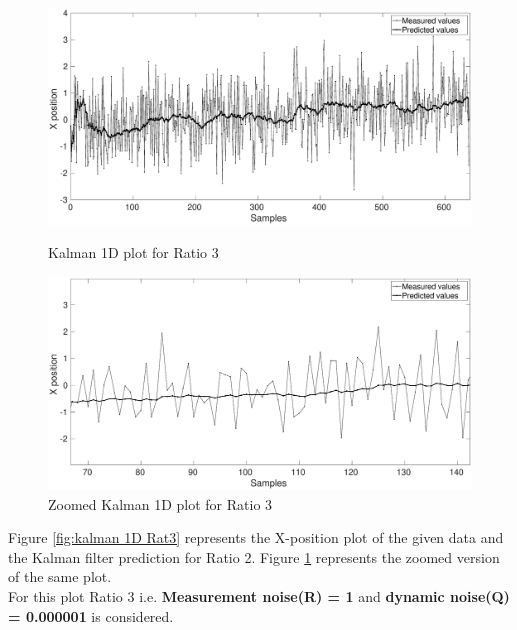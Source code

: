 \documentclass[12pt]{article}
\begin{document}
\begin{figure}[h]
\centering
\begin{minipage}{0.5\textwidth}
\centering
	\includegraphics[width = \textwidth]{./Figures/part1Ratio3.eps}
	\caption{Kalman 1D plot for Ratio 3}
	\label{fig:kalman 1D Rat3}
\end{minipage}%
\begin{minipage}{0.5\textwidth}
\centering
	\includegraphics[width = \textwidth]{./Figures/part1Ratio3zoomed.eps}
	\caption{ Zoomed Kalman 1D plot for Ratio 3}
	\label{fig: kalman 1D Rat3 zoom}
\end{minipage}
\end{figure}
\noindent
Figure \ref{fig:kalman 1D Rat3} represents the X-position plot of the given data and the Kalman filter prediction for Ratio 2. Figure \ref{fig: kalman 1D Rat3 zoom} represents the zoomed version of the same plot.\\
For this plot Ratio 3 i.e. \textbf{Measurement noise(R) = 1} and \textbf{dynamic noise(Q) = 0.000001} is considered.\\
\newpage
\end{document}
